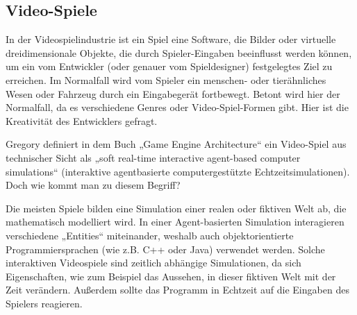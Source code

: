 \subsection{Video-Spiele}

In der Videospielindustrie ist ein Spiel eine Software, die Bilder oder virtuelle dreidimensionale Objekte, die durch Spieler-Eingaben beeinflusst werden können, um ein vom Entwickler (oder genauer vom Spieldesigner) festgelegtes Ziel zu erreichen. 
Im Normalfall wird vom Spieler ein menschen- oder tierähnliches Wesen oder Fahrzeug durch ein Eingabegerät fortbewegt. Betont wird hier der Normalfall, da es verschiedene Genres oder Video-Spiel-Formen gibt. Hier ist die Kreativität des Entwicklers gefragt.

Gregory definiert in dem Buch „Game Engine Architecture“ ein Video-Spiel aus technischer Sicht als „soft real-time interactive agent-based computer simulations“ \cite{gea}(interaktive agentbasierte computergestützte Echtzeitsimulationen).
Doch wie kommt man zu diesem Begriff?

Die meisten Spiele bilden eine Simulation einer realen oder fiktiven Welt ab, die mathematisch modelliert wird. In einer Agent-basierten Simulation interagieren verschiedene „Entities“ miteinander, weshalb auch objektorientierte Programmiersprachen (wie z.B. C++ oder Java) verwendet werden.
Solche interaktiven Videospiele sind zeitlich abhängige Simulationen, da sich Eigenschaften, wie zum Beispiel das Aussehen, in dieser fiktiven Welt mit der Zeit verändern. Außerdem sollte das Programm in Echtzeit auf die Eingaben des Spielers reagieren.
